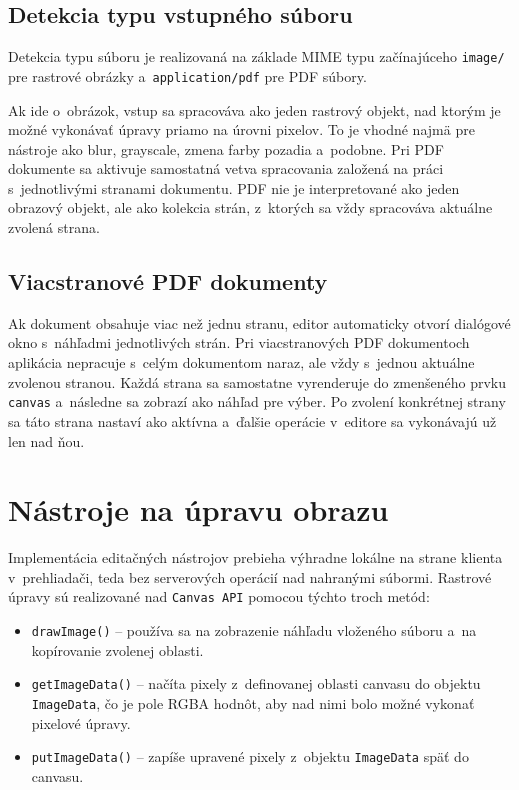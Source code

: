 \subsection{Detekcia typu vstupného súboru}

Detekcia typu súboru je realizovaná na základe MIME typu začínajúceho \texttt{image/} pre rastrové obrázky a~\texttt{application/pdf} pre PDF súbory.

Ak ide o~obrázok, vstup sa spracováva ako jeden rastrový objekt, nad ktorým je možné vykonávať úpravy priamo na úrovni pixelov. To je vhodné najmä pre nástroje ako blur, grayscale, zmena farby pozadia a~podobne. Pri PDF dokumente sa aktivuje samostatná vetva spracovania založená na práci s~jednotlivými stranami dokumentu. PDF nie je interpretované ako jeden obrazový objekt, ale ako kolekcia strán, z~ktorých sa vždy spracováva aktuálne zvolená strana.

\subsection{Viacstranové PDF dokumenty}

Ak dokument obsahuje viac než jednu stranu, editor automaticky otvorí dialógové okno s~náhľadmi jednotlivých strán. Pri viacstranových PDF dokumentoch aplikácia nepracuje s~celým dokumentom naraz, ale vždy s~jednou aktuálne zvolenou stranou. Každá strana sa samostatne vyrenderuje do zmenšeného prvku \texttt{canvas} a~následne sa zobrazí ako náhľad pre výber. Po zvolení konkrétnej strany sa táto strana nastaví ako aktívna a~ďalšie operácie v~editore sa vykonávajú už len nad ňou.

\section{Nástroje na úpravu obrazu}

Implementácia editačných nástrojov prebieha výhradne lokálne na strane klienta v~prehliadači, teda bez serverových operácií nad nahranými súbormi. Rastrové úpravy sú realizované nad \texttt{Canvas API} pomocou týchto troch metód:
\begin{itemize}
    \item \texttt{drawImage()} -- používa sa na zobrazenie náhľadu vloženého súboru a~na kopírovanie zvolenej oblasti.
    \item \texttt{getImageData()} -- načíta pixely z~definovanej oblasti canvasu do objektu \texttt{ImageData}, čo je pole RGBA hodnôt, aby nad nimi bolo možné vykonať pixelové úpravy.
    \item \texttt{putImageData()} -- zapíše upravené pixely z~objektu \texttt{ImageData} späť do canvasu.
\end{itemize} 

